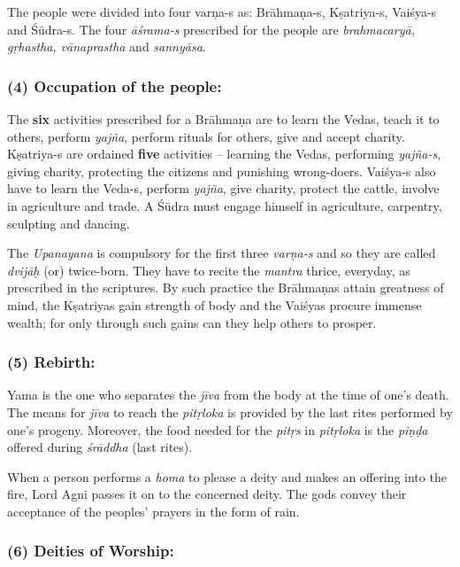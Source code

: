 \vskip -7pt

The people were divided into four varņa-s as: Brāhmaṇa-s, Kṣatriya-s, Vaiśya-s and Śūdra-s. The four \textit{āśrama-s} prescribed for the people are \textit{brahmacaryā, gṛhastha, vānaprastha} and \textit{sannyāsa}.


\subsubsection*{(4) Occupation of the people:}

\vskip -7pt

The \textbf{six} activities prescribed for a Brāhmaṇa are to learn the Vedas, teach it to others, perform \textit{yajña}, perform rituals for others, give and accept charity. Kṣatriya-s are ordained \textbf{five} activities – learning the Vedas, performing \textit{yajña-s}, giving charity, protecting the citizens and punishing wrong-doers. Vaiśya-s also have to learn the Veda-s, perform \textit{yajña}, give charity, protect the cattle, involve in agriculture and trade. A Śūdra must engage himself in agriculture, carpentry, sculpting and dancing.

The \textit{Upanayana} is compulsory for the first three \textit{varṇa-s} and so they are called \textit{dvijāḥ} (or) twice-born. They have to recite the \textit{mantra} thrice, everyday, as prescribed in the scriptures. By such practice the Brāhmaṇas attain greatness of mind, the Kṣatriyas gain strength of body and the Vaiśyas procure immense wealth; for only through such gains can they help others to prosper.


\subsubsection*{(5) Rebirth:}

\vskip -7pt

Yama is the one who separates the \textit{jīva} from the body at the time of one’s death. The means for \textit{jīva} to reach the \textit{pitṛloka} is provided by the last rites performed by one’s progeny. Moreover, the food needed for the \textit{pitṛs} in \textit{pitṛloka} is the \textit{piṇḍa} offered during \textit{śrāddha} (last rites).

When a person performs a \textit{homa} to please a deity and makes an offering into the fire, Lord Agni passes it on to the concerned deity. The gods convey their acceptance of the peoples’ prayers in the form of rain.


\subsubsection*{(6) Deities of Worship:}

